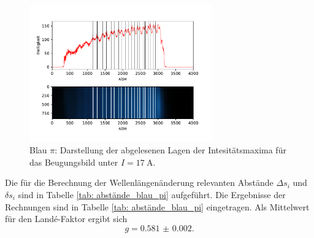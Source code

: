 \begin{figure}
  \centering
  \includegraphics[width = 0.7\textwidth]{../Messdaten/plots/peaks_blau_pi_17.pdf}
  \caption{Blau $\pi$: Darstellung der abgelesenen Lagen der Intesitätsmaxima für das Beugungsbild unter $I =\SI{17}{\ampere}$.}
  \label{fig: peaks_blau_pi_17}
\end{figure}
Die für die Berechnung der Wellenlängenänderung relevanten Abstände $\Delta s_i$ und $\delta s_i$ sind in Tabelle \ref{tab: abstände_blau_pi}
aufgeführt. Die Ergebnisse der Rechnungen sind in Tabelle \ref{tab: abstände_blau_pi} eingetragen.
Als Mittelwert für den Landé-Faktor ergibt sich
\begin{equation}
  g = \num{0.581(2)}.
\end{equation}


